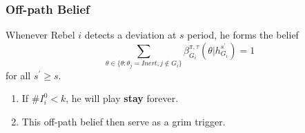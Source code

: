 \documentclass[10pt]{beamer}
\begin{document}
\begin{frame}
\frametitle{Off-path Belief}

Whenever Rebel $i$ detects a deviation at $s$ period, he forms the belief 
\begin{equation}
\label{eq_grim_trigger}
\sum_{\theta \in \{\theta:\theta_j=Inert,j\notin G_i\}}\beta^{\pi,\tau}_{G_i}({\theta}|h^{s^{'}}_{G_i})=1
\end{equation}
for all $s^{'}\geq s$. 

\begin{enumerate}
\item If $\# I^0_i<k$, he will play \textbf{stay} forever.
\item This off-path belief then serve as a grim trigger.
\end{enumerate}




\end{frame}
\end{document}
